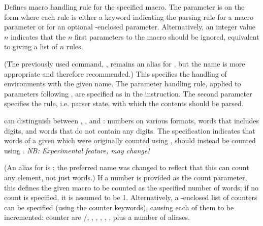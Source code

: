
\begin{description}
\sloppy

Defines macro handling rule for the specified macro. The parameter is on the form  where each rule is either a keyword indicating the parsing rule for a macro parameter or  for an optional \code{[]}-enclosed parameter. Alternatively, an integer value $n$ indicates that the $n$ first parameters to the macro should be ignored, equivalent to giving a list of $n$  rules.

(The previously used command, , remains an alias for , but the name  is more appropriate and therefore recommended.)
This specifies the handling of environments with the given name. The parameter handling rule, applied to parameters following , are specified as in the  instruction. The second parameter specifies the rule, i.e. parser state, with which the contents should be parsed.

\TeXcount{} can distinguish between , , and : numbers on various formats, words that includes digits, and words that do not contain any digits.
The  specification indicates that words of a given  which were originally counted using , should instead be counted using .
\textit{NB: Experimental feature, may change!}

(An alias for  is ; the preferred name was changed to reflect that this can count any element, not just words.)
If a number is provided as the count parameter, this defines the given macro to be counted as the specified number of words; if no count is specified, it is assumed to be 1. Alternatively, a \code{[]}-enclosed list of counters can be specified (using the counter keywords), causing each of them to be incremented: counter are /, , , , , ,  plus a number of aliases.


\end{description}
